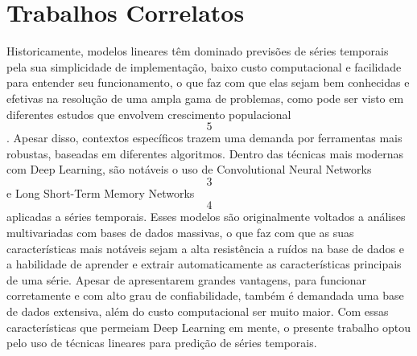\section{Trabalhos Correlatos}

Historicamente, modelos lineares têm dominado previsões de séries 
temporais pela sua simplicidade de implementação, baixo custo 
computacional e facilidade para entender seu funcionamento, o que 
faz com que elas sejam bem conhecidas e efetivas na resolução de 
uma ampla gama de problemas, como pode ser visto em diferentes 
estudos que envolvem crescimento populacional\[5\]. Apesar disso, 
contextos específicos trazem uma demanda por ferramentas mais robustas, 
baseadas em diferentes algoritmos. Dentro das técnicas mais modernas 
com Deep Learning, são notáveis o uso de Convolutional Neural Networks\[3\] 
e Long Short-Term Memory Networks\[4\] aplicadas a séries temporais. 
Esses modelos são originalmente voltados a análises multivariadas 
com bases de dados massivas, o que faz com que as suas características 
mais notáveis sejam a alta resistência a ruídos na base de dados e a 
habilidade de aprender e extrair automaticamente as características 
principais de uma série. Apesar de apresentarem grandes vantagens, para 
funcionar corretamente e com alto grau de confiabilidade, também é 
demandada uma base de dados extensiva, além do custo computacional ser 
muito maior. Com essas características que permeiam Deep Learning em mente, 
o presente trabalho optou pelo uso de técnicas lineares para predição de séries temporais.
